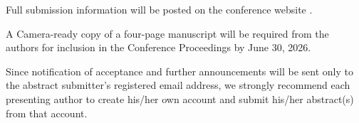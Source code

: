 Full submission information will be posted on the conference website \cite{b1}.

A Camera-ready copy of a four-page manuscript will be required from the authors for inclusion in the Conference Proceedings by June 30, 2026.

Since notification of acceptance and further announcements will be sent only to the abstract submitter's registered email address, we strongly recommend each presenting author to create his/her own account and submit his/her abstract(s) from that account.
